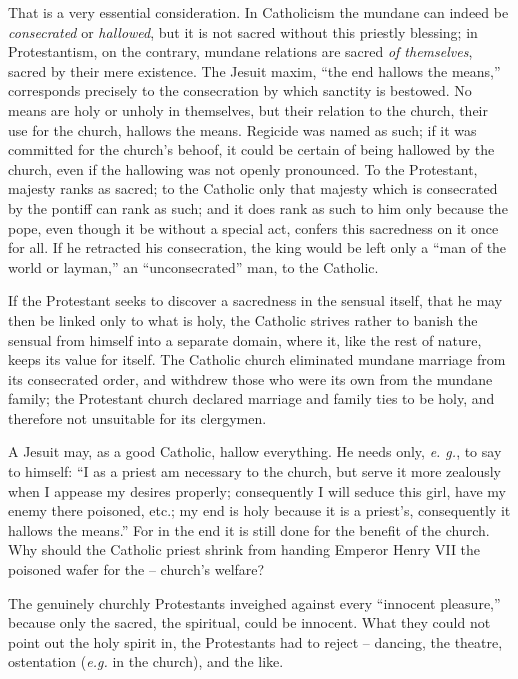 \documentclass[12pt,a4paper]{book}
\begin{document}
That is a very essential consideration. In Catholicism the mundane can indeed 
be \textit{consecrated} or \textit{hallowed}, but it is not sacred without 
this priestly blessing; in Protestantism, on the contrary, mundane relations 
are sacred \textit{of themselves}, sacred by their mere existence. The Jesuit 
maxim, ``the end hallows the means,'' corresponds precisely to the 
consecration by which sanctity is bestowed. No means are holy or unholy in 
themselves, but their relation to the church, their use for the church, 
hallows the means. Regicide was named as such; if it was committed for the 
church's behoof, it could be certain of being hallowed by the church, even if 
the hallowing was not openly pronounced. To the Protestant, majesty ranks as 
sacred; to the Catholic only that majesty which is consecrated by the pontiff 
can rank as such; and it does rank as such to him only because the pope, even 
though it be without a special act, confers this sacredness on it once for 
all. If he retracted his consecration, the king would be left only a ``man of 
the world or layman,'' an ``unconsecrated'' man, to the Catholic.

If the Protestant seeks to discover a sacredness in the sensual itself, that 
he may then be linked only to what is holy, the Catholic strives rather to 
banish the sensual from himself into a separate domain, where it, like the 
rest of nature, keeps its value for itself. The Catholic church eliminated 
mundane marriage from its consecrated order, and withdrew those who were its 
own from the mundane family; the Protestant church declared marriage and 
family ties to be holy, and therefore not unsuitable for its clergymen.

A Jesuit may, as a good Catholic, hallow everything. He needs only, \textit{e. 
g.}, to say to himself: ``I as a priest am necessary to the church, but serve 
it more zealously when I appease my desires properly; consequently I will 
seduce this girl, have my enemy there poisoned, etc.; my end is holy because 
it is a priest's, consequently it hallows the means.'' For in the end it is 
still done for the benefit of the church. Why should the Catholic priest 
shrink from handing Emperor Henry VII the poisoned wafer for the -- church's 
welfare?

The genuinely churchly Protestants inveighed against every ``innocent 
pleasure,'' because only the sacred, the spiritual, could be innocent. What 
they could not point out the holy spirit in, the Protestants had to reject -- 
dancing, the theatre, ostentation (\textit{e.g.} in the church), and the 
like.
\end{document}
